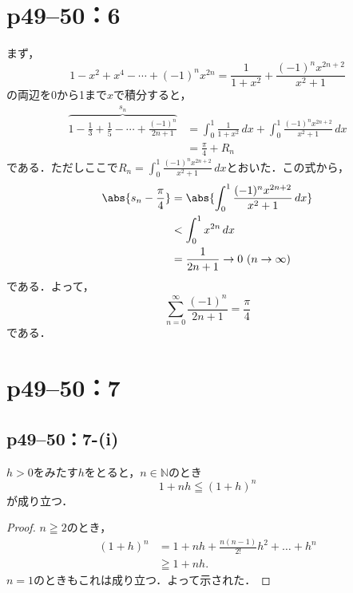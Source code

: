 \documentclass[a4paper,10pt,fleqn]{ltjsarticle}
\begin{document}
\section*{p49--50：6}
\begin{tleftbar}
    まず，
    \[
        1-x^2+x^4-\cdots+(-1)^n x^{2n} =\frac{1}{1+x^2} +\frac{(-1)^n x^{2n+2}}{x^2+1}
    \]
    の両辺を0から1まで$x$で積分すると，
    \begin{align*}
        \overbrace{1-\frac{1}{3}+\frac{1}{5}-\cdots+\frac{(-1)^n}{2n+1}}^{s_n} & =\int_{0}^{1} \frac{1}{1+x^2} \, dx +\int_{0}^{1}\frac{(-1)^n x^{2n+2}}{x^2+1}  \, dx \\
                                                                               & = \frac{\pi}{4} + R_n
    \end{align*}
    である．ただしここで$R_n =\int_{0}^{1}\frac{(-1)^n x^{2n+2}}{x^2+1} \, dx$とおいた．この式から，
    \begin{align*}
        \abs{s_n -\frac{\pi}{4}  } & = \abs{\int_{0}^{1}\frac{(-1)^n x^{2n+2}}{x^2+1} \, dx } \\
                                   & < \int_{0}^{1} x^{2n} \, dx                              \\
                                   & =\frac{1}{2n+1} \to 0 ~(n \to \infty)
    \end{align*}
    である．よって，
    \[
        \sum_{n=0}^{\infty} \frac{(-1)^n}{2n+1} =\frac{\pi}{4}
    \]
    である．
\end{tleftbar}

\newpage

\section*{p49--50：7}


\subsection*{p49--50：7-(i)}



$h>0$をみたす$h$をとると，$n \in \mathbb{N}$のとき
\[
    1+nh \leqq (1+h)^n
\]
が成り立つ．

\begin{proof}
    $n \geqq 2$のとき，
    \begin{align*}
        (1+h)^n & = 1+nh + \frac{n(n-1)}{2!}h^2 + \dots + h^n \\
                & \geqq 1+nh.
    \end{align*}
    $n = 1$のときもこれは成り立つ．よって示された．
\end{proof}
\end{document}
